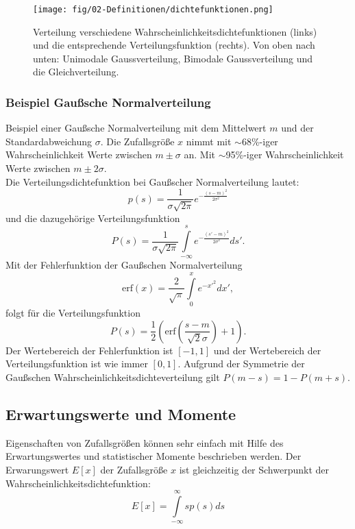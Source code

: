 \begin{figure}
\centering
\texttt{[image: fig/02-Definitionen/dichtefunktionen.png]}
\caption{Verteilung verschiedene Wahrscheinlichkeitsdichtefunktionen (links) und die entsprechende Verteilungsfunktion (rechts). Von oben nach unten: Unimodale Gaussverteilung, Bimodale Gaussverteilung und die Gleichverteilung.}
\label{fig:stoch_distribution}
\end{figure}

\subsubsection*{Beispiel Gaußsche Normalverteilung}
Beispiel einer Gaußsche Normalverteilung mit dem Mittelwert $m$ und der Standardabweichung $\sigma$. Die Zufallsgröße $x$ nimmt mit $\sim$68\%-iger Wahrscheinlichkeit Werte zwischen $m \pm \sigma$ an. Mit $\sim$95\%-iger Wahrscheinlichkeit Werte zwischen $m \pm 2\sigma$.\\
Die Verteilungsdichtefunktion bei Gaußscher Normalverteilung lautet:
\begin{equation}
p(s)=\frac{1}{\sigma \sqrt{2\pi}}e^{-\frac{(s-m)^2}{2\sigma^2}}
\end{equation}
und die dazugehörige Verteilungsfunktion
\[
P(s)=\frac{1}{\sigma \sqrt{2\pi}}\int\limits_{-\infty}^s e^{{-\frac{(s'-m)^2}{2\sigma^2}}}ds'.
\]
Mit der Fehlerfunktion der Gaußschen Normalverteilung
\[
\mbox{erf}(x)=\frac{2}{\sqrt{\pi}}\int\limits_0^x e^{-x'^2}dx',
\]
folgt für die Verteilungsfunktion
\[
P(s) = \frac{1}{2} \left( \mbox{erf}\left(\frac{s-m}{\sqrt{2} \sigma} \right) + 1\right).
\]
Der Wertebereich der Fehlerfunktion ist $[-1,1]$ und der Wertebereich der Verteilungsfunktion ist wie immer $[0,1]$. Aufgrund der Symmetrie der Gaußschen Wahrscheinlichkeitsdichteverteilung gilt $P(m-s) = 1 - P(m+s)$.

\subsection{Erwartungswerte und Momente}
Eigenschaften von Zufallsgrößen können sehr einfach mit Hilfe des Erwartungswertes und statistischer Momente beschrieben werden. Der Erwarungswert $E[x]$ der Zufallsgröße $x$ ist gleichzeitig der Schwerpunkt der Wahrscheinlichkeitsdichtefunktion:
\begin{equation}
E[x] = \int\limits_{-\infty}^{\infty}sp(s)ds
\end{equation}


